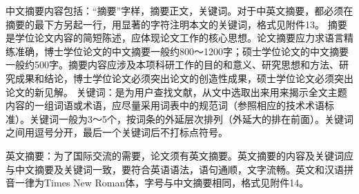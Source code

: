 \documentclass[master,openright,twoside,color,AutoFakeBold=true]{misc/buaathesis}
\begin{document}
\fi


\frontmatter
\pagestyle{frontmatter}

\begin{cabstract}
  中文摘要内容包括：“摘要”字样，摘要正文，关键词。对于中英文摘要，都必须在摘要的最下方另起一行，用显著的字符注明本文的关键词，格式见附件13。
  摘要是学位论文内容的简短陈述，应体现论文工作的核心思想。论文摘要应力求语言精练准确，博士学位论文的中文摘要一般约800～1200字；硕士学位论文的中文摘要一般约500字。摘要内容应涉及本项科研工作的目的和意义、研究思想和方法、研究成果和结论，博士学位论文必须突出论文的创造性成果，硕士学位论文必须突出论文的新见解。
  关键词：是为用户查找文献，从文中选取出来用来揭示全文主题内容的一组词语或术语，应尽量采用词表中的规范词（参照相应的技术术语标准）。关键词一般为3～5个，按词条的外延层次排列（外延大的排在前面）。关键词之间用逗号分开，最后一个关键词后不打标点符号。  
\end{cabstract}

\begin{eabstract}
  英文摘要：为了国际交流的需要，论文须有英文摘要。英文摘要的内容及关键词应与中文摘要及关键词一致，要符合英语语法，语句通顺，文字流畅。英文和汉语拼音一律为Times New Roman体，字号与中文摘要相同，格式见附件14。
\end{eabstract}

\ifdefined\maindoc
\else
  
\end{document}
